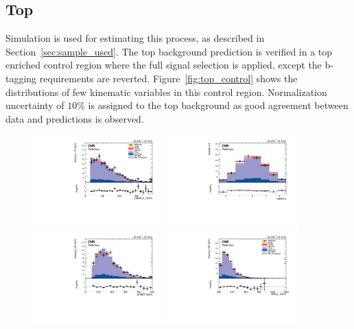 \subsection{Top}
Simulation is used for estimating this process, as described in Section~\ref{sec:sample_used}. The top background prediction is verified in a top enriched control region where the full signal selection is applied, except the b-tagging requirements are reverted. Figure~\ref{fig:top_control} shows the distributions of few kinematic variables in this control region. Normalization uncertainty of $10\%$ is assigned to the top background as good agreement between data and predictions is observed. 

\begin{figure}[!htbp]
\centering
\includegraphics[width=0.45\textwidth]{Plots/plots/DibosonBoostedElMuCuts13TeV_TTBarControlRegion_CHS_lepton_pt.pdf}
\includegraphics[width=0.45\textwidth]{Plots/plots/DibosonBoostedElMuCuts13TeV_TTBarControlRegion_CHS_lepton_eta.pdf}
\includegraphics[width=0.45\textwidth]{Plots/plots/DibosonBoostedElMuCuts13TeV_TTBarControlRegion_CHS_pfMET_Corr.pdf}
\includegraphics[width=0.45\textwidth]{Plots/plots/DibosonBoostedElMuCuts13TeV_TTBarControlRegion_CHS_ungroomed_PuppiAK8_jet_pt.pdf}

\end{figure}
